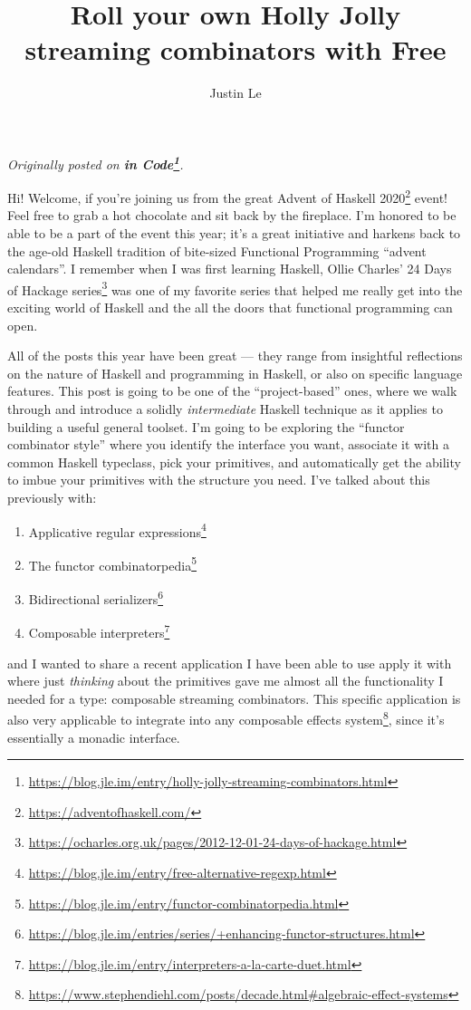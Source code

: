 \documentclass[]{article}
\title{Roll your own Holly Jolly streaming combinators with Free}
\author{Justin Le}
\renewcommand{\href}[2]{#2\footnote{\url{#1}}}
\begin{document}
\maketitle

\emph{Originally posted on
\textbf{\href{https://blog.jle.im/entry/holly-jolly-streaming-combinators.html}{in
Code}}.}

Hi! Welcome, if you're joining us from the great
\href{https://adventofhaskell.com/}{Advent of Haskell 2020} event! Feel free to
grab a hot chocolate and sit back by the fireplace. I'm honored to be able to be
a part of the event this year; it's a great initiative and harkens back to the
age-old Haskell tradition of bite-sized Functional Programming ``advent
calendars''. I remember when I was first learning Haskell,
\href{https://ocharles.org.uk/pages/2012-12-01-24-days-of-hackage.html}{Ollie
Charles' 24 Days of Hackage series} was one of my favorite series that helped me
really get into the exciting world of Haskell and the all the doors that
functional programming can open.

All of the posts this year have been great --- they range from insightful
reflections on the nature of Haskell and programming in Haskell, or also on
specific language features. This post is going to be one of the
``project-based'' ones, where we walk through and introduce a solidly
\emph{intermediate} Haskell technique as it applies to building a useful general
toolset. I'm going to be exploring the ``functor combinator style'' where you
identify the interface you want, associate it with a common Haskell typeclass,
pick your primitives, and automatically get the ability to imbue your primitives
with the structure you need. I've talked about this previously with:

\begin{enumerate}
\def\labelenumi{\arabic{enumi}.}
\tightlist
\item
  \href{https://blog.jle.im/entry/free-alternative-regexp.html}{Applicative
  regular expressions}
\item
  \href{https://blog.jle.im/entry/functor-combinatorpedia.html}{The functor
  combinatorpedia}
\item
  \href{https://blog.jle.im/entries/series/+enhancing-functor-structures.html}{Bidirectional
  serializers}
\item
  \href{https://blog.jle.im/entry/interpreters-a-la-carte-duet.html}{Composable
  interpreters}
\end{enumerate}

and I wanted to share a recent application I have been able to use apply it with
where just \emph{thinking} about the primitives gave me almost all the
functionality I needed for a type: composable streaming combinators. This
specific application is also very applicable to integrate into any
\href{https://www.stephendiehl.com/posts/decade.html\#algebraic-effect-systems}{composable
effects system}, since it's essentially a monadic interface.
\end{document}
